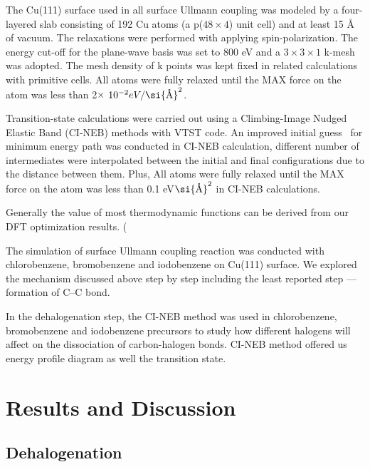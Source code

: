 \documentclass[%
 reprint,
 amsmath,amssymb,
 aps,
prb,
]{revtex4-2}
\newcommand{\angstrom}{\textup{\AA}}
\begin{document}
The Cu(111) surface used in all surface Ullmann coupling was 
modeled by a four-layered slab consisting of 192 Cu atoms (a p($48\times 4$) unit cell) and at least 15 \si{\angstrom} of vacuum. The relaxations were performed with applying spin-polarization. The energy cut-off for the plane-wave basis was set to 800 eV and a $3\times 3 \times1$ k-mesh was adopted. The mesh density of k points was kept fixed in related calculations with primitive cells. All atoms were fully relaxed until the MAX force on the atom was less than 2$\times$ $10^{-2} eV/\si{\angstrom}^{2}$. 

Transition-state calculations were carried out using a Climbing-Image Nudged Elastic Band (CI-NEB) methods with VTST code\cite{ullmann_59}. An improved initial guess~\cite{ullmann_60} for minimum energy path was conducted in CI-NEB calculation, different number of intermediates were interpolated between the initial and final configurations due to the distance between them. Plus, All atoms were fully relaxed until the MAX force on the atom was less than 0.1 eV$\si{\angstrom}^{2}$ in CI-NEB calculations.

Generally the value of most thermodynamic functions can be derived from our DFT optimization results. 
(%

The simulation of surface Ullmann coupling reaction was conducted with chlorobenzene, bromobenzene and iodobenzene on Cu(111) surface. We explored the mechanism discussed above step by step including the least reported step --- formation of C--C bond.

In the dehalogenation step, the CI-NEB method was used in chlorobenzene, bromobenzene and iodobenzene precursors to study how different halogens will affect on the dissociation of carbon-halogen bonds. CI-NEB method offered us energy profile diagram as well the transition state.

\section{Results and Discussion}

\subsection{Dehalogenation}
\end{document}
